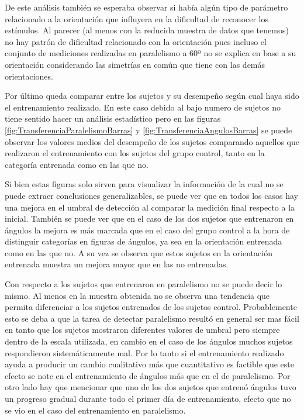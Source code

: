 \documentclass{article}
\numberwithin{figure}{section}
\begin{document}
    De este análisis también se esperaba observar si había algún tipo de parámetro relacionado a la orientación que influyera en la dificultad de reconocer los estímulos. Al parecer (al menos con la reducida muestra de datos que tenemos) no hay patrón de dificultad relacionado con la orientación pues incluso el conjunto de mediciones realizadas en paralelismo a 60º no se explica en base a su orientación considerando las simetrías en común que tiene con las demás orientaciones.
    
    Por último queda comparar entre los sujetos y su desempeño según cual haya sido el entrenamiento realizado. En este caso debido al bajo numero de sujetos no tiene sentido hacer un análisis estadístico pero en las figuras \ref{fig:TransferenciaParalelismoBarras} y \ref{fig:TransferenciaAngulosBarras} se puede observar los valores medios del desempeño de los sujetos comparando aquellos que realizaron el entrenamiento con los sujetos del grupo control, tanto en la categoría entrenada como en las que no.  
    
    Si bien estas figuras solo sirven para visualizar la información de la cual no se puede extraer conclusiones generalizables, se puede ver que en todos los casos hay una mejora en el umbral de detección al comparar la medición final respecto a la inicial. También se puede ver que en el caso de los dos sujetos que entrenaron en ángulos la mejora es más marcada que en el caso del grupo control a la hora de distinguir categorías en figuras de ángulos, ya sea en la orientación entrenada como en las que no. A su vez se observa que estos sujetos en la orientación entrenada muestra un mejora mayor que en las no entrenadas. 
    
    Con respecto a los sujetos que entrenaron en paralelismo no se puede decir lo mismo. Al menos en la muestra obtenida no se observa una tendencia que permita diferenciar a los sujetos entrenados de los sujetos control. Probablemente esto se deba a que la tarea de detectar paralelismo resultó en general ser mas fácil en tanto que los sujetos mostraron diferentes valores de umbral pero siempre dentro de la escala utilizada, en cambio en el caso de los ángulos muchos sujetos respondieron sistemáticamente mal. Por lo tanto si el entrenamiento realizado ayuda a producir un cambio cualitativo más que cuantitativo es factible que este efecto se note en el entrenamiento de ángulos más que en el de paralelismo. Por otro lado hay que mencionar que uno de los dos sujetos que entrenó ángulos tuvo un progreso gradual durante todo el primer día de entrenamiento, efecto que no se vio en el caso del entrenamiento en paralelismo. 
    
\end{document}
